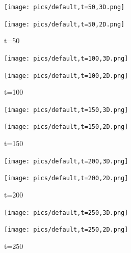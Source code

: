 \documentclass{article}
\begin{document}
	\begin{figure}[htbp]
		\begin{minipage}{0.49\textwidth}
			\texttt{[image: pics/default,t=50,3D.png]}
		\end{minipage}
		\begin{minipage}{0.49\textwidth}
			\texttt{[image: pics/default,t=50,2D.png]}
		\end{minipage}
		\caption{t=50}
		\label{fig1}
	\end{figure}
	
	\begin{figure}[htbp]
		\begin{minipage}{0.49\textwidth}
			\texttt{[image: pics/default,t=100,3D.png]}
		\end{minipage}
		\begin{minipage}{0.49\textwidth}
			\texttt{[image: pics/default,t=100,2D.png]}
		\end{minipage}
		\caption{t=100}
		\label{fig2}
	\end{figure}
	
	
	\begin{figure}[htbp]
		\begin{minipage}{0.49\textwidth}
			\texttt{[image: pics/default,t=150,3D.png]}
		\end{minipage}
		\begin{minipage}{0.49\textwidth}
			\texttt{[image: pics/default,t=150,2D.png]}
		\end{minipage}
		\caption{t=150}
		\label{fig3}
	\end{figure}

	
	\begin{figure}[htbp]
		\begin{minipage}{0.49\textwidth}
			\texttt{[image: pics/default,t=200,3D.png]}
		\end{minipage}
		\begin{minipage}{0.49\textwidth}
			\texttt{[image: pics/default,t=200,2D.png]}
		\end{minipage}
		\caption{t=200}
		\label{fig4}
	\end{figure}

	
	\begin{figure}[htbp]
		\begin{minipage}{0.49\textwidth}
			\texttt{[image: pics/default,t=250,3D.png]}
		\end{minipage}
		\begin{minipage}{0.49\textwidth}
			\texttt{[image: pics/default,t=250,2D.png]}
		\end{minipage}
		\caption{t=250}
		\label{fig5}
	\end{figure}
\end{document}
